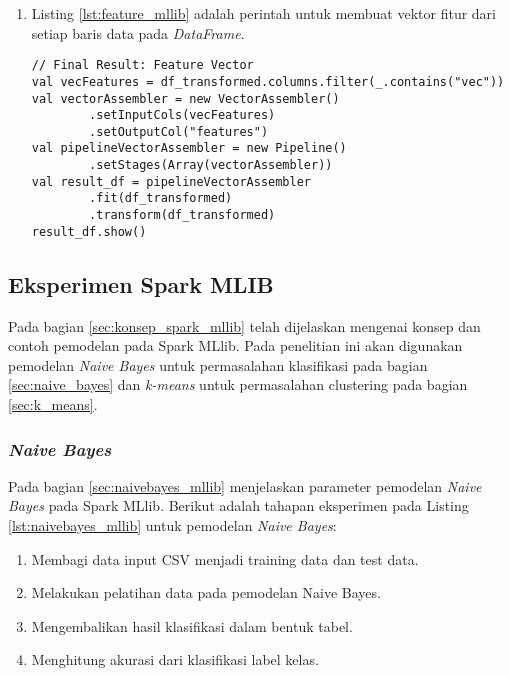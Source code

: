 \begin{enumerate}
\newpage
\item Listing \ref{lst:feature_mllib} adalah perintah untuk membuat vektor fitur dari setiap baris data pada \textit{DataFrame}.
\begin{lstlisting}[basicstyle=\ttfamily, frame=single,
	columns=fullflexible, keepspaces=true, breaklines=true, label=lst:feature_mllib, caption=Membuat Vektor Fitur]
// Final Result: Feature Vector
val vecFeatures = df_transformed.columns.filter(_.contains("vec"))
val vectorAssembler = new VectorAssembler()
		.setInputCols(vecFeatures)
		.setOutputCol("features")
val pipelineVectorAssembler = new Pipeline()
		.setStages(Array(vectorAssembler))
val result_df = pipelineVectorAssembler
		.fit(df_transformed)
		.transform(df_transformed)
result_df.show()
\end{lstlisting}

\end{enumerate}


\subsection{Eksperimen Spark MLIB}
Pada bagian \ref{sec:konsep_spark_mllib} telah dijelaskan mengenai konsep dan contoh pemodelan pada Spark MLlib. Pada penelitian ini akan digunakan pemodelan \textit{Naive Bayes} untuk permasalahan klasifikasi pada bagian \ref{sec:naive_bayes} dan \textit{k-means} untuk permasalahan clustering pada bagian \ref{sec:k_means}.

\subsubsection{\textit{Naive Bayes}}
\noindent Pada bagian \ref{sec:naivebayes_mllib} menjelaskan parameter pemodelan \textit{Naive Bayes} pada Spark MLlib. Berikut adalah tahapan eksperimen pada Listing \ref{lst:naivebayes_mllib} untuk pemodelan \textit{Naive Bayes}:
\begin{enumerate}
\item Membagi data input CSV menjadi training data dan test data.
\item Melakukan pelatihan data pada pemodelan Naive Bayes.
\item Mengembalikan hasil klasifikasi dalam bentuk tabel.
\item Menghitung akurasi dari klasifikasi label kelas.
\end{enumerate}	

